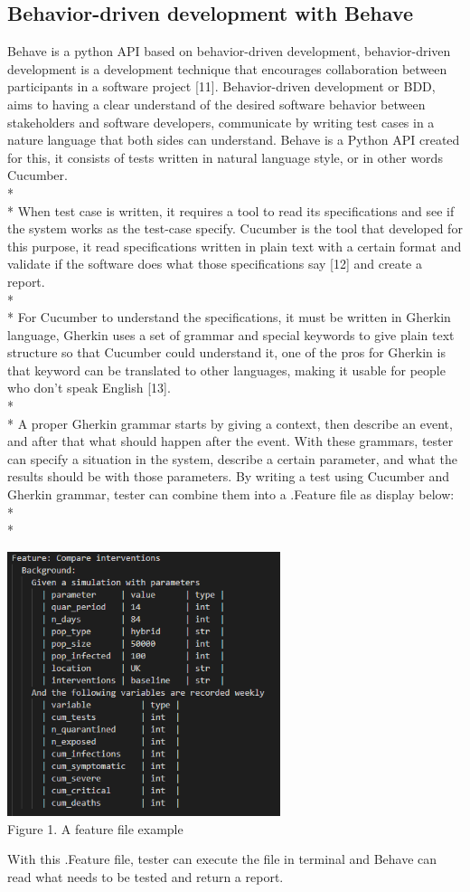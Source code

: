 \subsection{Behavior-driven development with Behave}
Behave is a python API based on behavior-driven development, behavior-driven development is a development technique that encourages collaboration between participants in a software project [11]. Behavior-driven development or BDD, aims to having a clear understand of the desired software behavior between stakeholders and software developers, communicate by writing test cases in a nature language that both sides can understand. Behave is a Python API created for this, it consists of tests written in natural language style, or in other words Cucumber. \\*\\*
When test case is written, it requires a tool to read its specifications and see if the system works as the test-case specify. Cucumber is the tool that developed for this purpose, it read specifications written in plain text with a certain format and validate if the software does what those specifications say [12] and create a report. \\*\\*
For Cucumber to understand the specifications, it must be written in Gherkin language, Gherkin uses a set of grammar and special keywords to give plain text structure so that Cucumber could understand it, one of the pros for Gherkin is that keyword can be translated to other languages, making it usable for people who don’t speak English [13]. \\*\\*
A proper Gherkin grammar starts by giving a context, then describe an event, and after that what should happen after the event. With these grammars, tester can specify a situation in the system, describe a certain parameter, and what the results should be with those parameters.
By writing a test using Cucumber and Gherkin grammar, tester can combine them into a .Feature file as display below: \\*\\*

\begin{center}
	\includegraphics[width=8cm]{figures/featureFile.png}\\
	Figure 1. A feature file example
\end{center}
With this .Feature file, tester can execute the file in terminal and Behave can read what needs to be tested and return a report.

